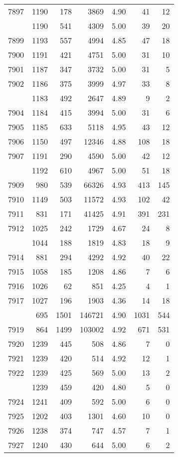 \documentclass[
]{article}
\begin{document}
\begin{table}
\begin{tabular}[t]{lrrrrrr}
7897 & 1190 & 178 & 3869 & 4.90 & 41 & 12\\
\addlinespace
7898 & 1190 & 541 & 4309 & 5.00 & 39 & 20\\
7899 & 1193 & 557 & 4994 & 4.85 & 47 & 18\\
7900 & 1191 & 421 & 4751 & 5.00 & 31 & 10\\
7901 & 1187 & 347 & 3732 & 5.00 & 31 & 5\\
7902 & 1186 & 375 & 3999 & 4.97 & 33 & 8\\
\addlinespace
7903 & 1183 & 492 & 2647 & 4.89 & 9 & 2\\
7904 & 1184 & 415 & 3994 & 5.00 & 31 & 6\\
7905 & 1185 & 633 & 5118 & 4.95 & 43 & 12\\
7906 & 1150 & 497 & 12346 & 4.88 & 108 & 18\\
7907 & 1191 & 290 & 4590 & 5.00 & 42 & 12\\
\addlinespace
7908 & 1192 & 610 & 4967 & 5.00 & 51 & 18\\
7909 & 980 & 539 & 66326 & 4.93 & 413 & 145\\
7910 & 1149 & 503 & 11572 & 4.93 & 102 & 42\\
7911 & 831 & 171 & 41425 & 4.91 & 391 & 231\\
7912 & 1025 & 242 & 1729 & 4.67 & 24 & 8\\
\addlinespace
7913 & 1044 & 188 & 1819 & 4.83 & 18 & 9\\
7914 & 881 & 294 & 4292 & 4.92 & 40 & 22\\
7915 & 1058 & 185 & 1208 & 4.86 & 7 & 6\\
7916 & 1026 & 62 & 851 & 4.25 & 4 & 1\\
7917 & 1027 & 196 & 1903 & 4.36 & 14 & 18\\
\addlinespace
7918 & 695 & 1501 & 146721 & 4.90 & 1031 & 544\\
7919 & 864 & 1499 & 103002 & 4.92 & 671 & 531\\
7920 & 1239 & 445 & 508 & 4.86 & 7 & 0\\
7921 & 1239 & 420 & 514 & 4.92 & 12 & 1\\
7922 & 1239 & 425 & 569 & 5.00 & 13 & 2\\
\addlinespace
7923 & 1239 & 459 & 420 & 4.80 & 5 & 0\\
7924 & 1241 & 409 & 592 & 5.00 & 6 & 0\\
7925 & 1202 & 403 & 1301 & 4.60 & 10 & 0\\
7926 & 1238 & 374 & 747 & 4.57 & 7 & 1\\
7927 & 1240 & 430 & 644 & 5.00 & 6 & 2\\

\end{tabular}
\end{table}
\end{document}
